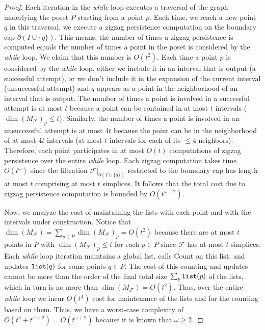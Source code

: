 \documentclass[11pt]{article}
\theoremstyle{definition}
\newcommand{\Pb}{P}
\newcommand{\NN}{t}
\begin{document}
\begin{proof}
Each iteration in the {\it while} loop executes a traversal of the graph underlying
the poset $\Pb$ starting from a point $p$. Each time, we reach a new point $q$ in this
traversal, we execute a zigzag persistence computation on the boundary cap $\partial (I\cup \{q\})$.
This means, the number of times a zigzag persistence is computed equals the number of times
a point in the poset is considered by the {\it while} loop. We claim that this number is $O(\NN^2)$.
Each time a point $p$ is considered by the {\it while} loop, either we include it in an interval
that is output (a successful attempt), or we don't include it in the expansion of the current
interval (unsuccessful attempt) and $q$ appears as a point in the neighborhood of an interval that is output.
The number of times a point is involved in a successful attempt is at most $\NN$ because a point can be contained in at most $\NN$ intervals ($\dim (M_{\mathcal F})_p\leq \NN$). Similarly, the number of times a point is involved in an unsuccessful attempt is at most $4\NN$ because the point
can be in the neighborhood of at most $4\NN$ intervals (at most $\NN$ intervals for each of its $\leq 4$ neighbors).
Therefore, each point participates in at most $O(\NN)$ computations of zigzag persistence 
over the entire {\it while} loop. Each zigzag computation takes time $O(\NN^{\omega})$ since the 
filtration ${\mathcal F}|_{\partial (I\cup \{q\})}$ restricted to the boundary cap has  length at most $\NN$ comprising at most $t$ simplices. 
It follows that the total cost due to zigzag persistence computation
is bounded by $O(\NN^{\omega+2})$.

Now, we analyze the cost of maintaining the lists with each point and 
with the intervals under construction.
Notice that $\dim (M_{\mathcal F})=\sum_{p\in \Pb} \dim (M_{\mathcal F})_p=O(\NN^2)$ because there are at most $t$ points in
$\Pb$ with $\dim (M_{\mathcal F})_p\leq \NN$ for each $p\in \Pb$ since $\mathcal F$ has at most $\NN$ simplices. Each {\it while} loop iteration maintains a global list, calls {\sc Count} on this list,
and updates ${\tt list}(q)$ for some points $q\in \Pb$. 
The cost of this counting and updates cannot be more than the order of the final total size $\sum_p {\tt list}(p)$ of the lists, which in turn
is no more than $\dim (M_{\mathcal F})=O(\NN^2)$. Thus, over the entire {\it while} loop
we incur $O(\NN^4)$ cost for maintenance of the lists and for the counting based on them. 
Thus, we have a worst-case complexity of $O(\NN^4+\NN^{\omega+2})=O(\NN^{\omega+2})$ because it
is known that $\omega\geq 2$.
\end{proof}
\end{document}
